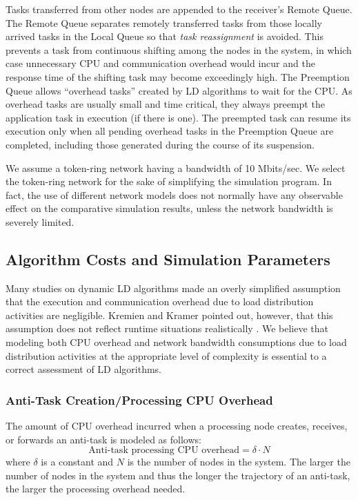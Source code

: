 Tasks transferred from other nodes are appended to the receiver's Remote Queue.
The Remote Queue separates remotely transferred
tasks from those locally arrived tasks in the Local Queue so that
{\it task reassignment\/} is avoided.
This prevents a task from continuous
shifting among the nodes in the system, in which case unnecessary CPU
and communication overhead would incur and the
response time of the shifting task may become exceedingly high.
%
The Preemption Queue allows ``overhead tasks''
created by LD algorithms to wait for the CPU.
As overhead tasks are usually small and time critical,
they always preempt the application task in execution
(if there is one). 
The preempted task can resume its execution only when all
pending overhead tasks in the Preemption Queue are completed,
including those generated during the course of its suspension.

We assume a token-ring network having
a bandwidth of 10 Mbits/sec.
We select the token-ring network for the sake of
simplifying the simulation program. 
In fact, the use of different network models does
not normally have any observable effect on the comparative
simulation results, unless the network bandwidth
is severely limited. 



\subsection {Algorithm Costs and Simulation Parameters}
\label{sec:anti.basic.cost_model}
%
Many studies on dynamic LD algorithms made an overly simplified
assumption that the execution and communication overhead due to
load distribution activities are negligible.
Kremien and Kramer pointed out, however, that this assumption 
does not reflect runtime situations realistically \cite{kremien92}.
%
We believe that modeling both CPU overhead and network bandwidth
consumptions due to load distribution activities at the appropriate level
of complexity is essential to a correct assessment of LD algorithms.




\subsubsection {Anti-Task Creation/Processing CPU Overhead}

The amount of CPU overhead incurred when a processing node
creates, receives, or forwards an anti-task is modeled as follows:
%
\begin{equation}
	\mbox{Anti-task processing CPU overhead}
	= \delta \cdot N
\end{equation}
%
where $\delta$ is a constant and $N$ is the number of nodes in the system.
The larger the number of nodes in the system and thus
the longer the trajectory of an anti-task,
the larger the processing overhead needed.




